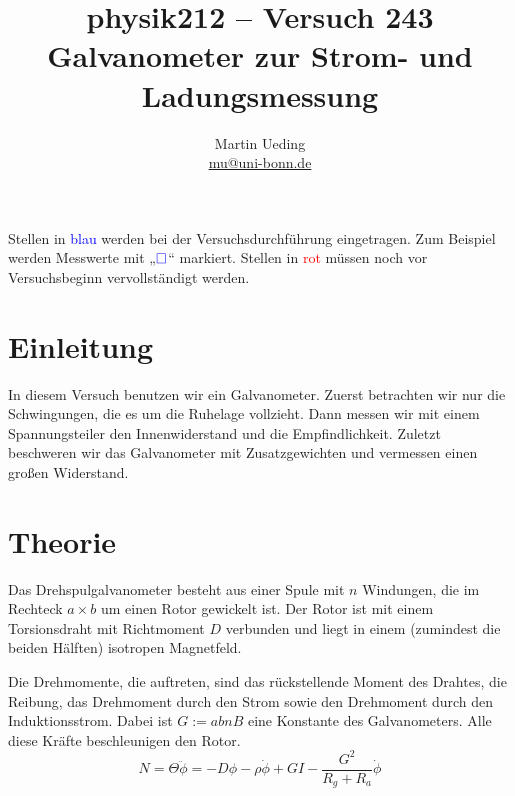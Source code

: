 \documentclass[11pt, ngerman]{article}
\title{physik212 -- Versuch 243 \\ Galvanometer zur Strom- und Ladungsmessung}
\author{Martin Ueding \\ {\small \href{mailto:mu@uni-bonn.de}{mu@uni-bonn.de}}}
\newcommand{\messwert}{\textcolor{blue}{\square}}
\begin{document}
\maketitle

\tableofcontents

\vfill

\begin{small}
	Stellen in \textcolor{blue}{blau} werden bei der Versuchsdurchführung
	eingetragen. Zum Beispiel werden Messwerte mit „$\messwert$“ markiert.
	Stellen in \textcolor{red}{rot} müssen noch vor Versuchsbeginn
	vervollständigt werden.
\end{small}

\newpage


\section{Einleitung}

In diesem Versuch benutzen wir ein Galvanometer. Zuerst betrachten wir nur die
Schwingungen, die es um die Ruhelage vollzieht. Dann messen wir mit einem
Spannungsteiler den Innenwiderstand und die Empfindlichkeit. Zuletzt beschweren
wir das Galvanometer mit Zusatzgewichten und vermessen einen großen Widerstand.


\section{Theorie}

Das Drehspulgalvanometer besteht aus einer Spule mit $n$ Windungen, die im
Rechteck $a \times b$ um einen Rotor gewickelt ist. Der Rotor ist mit einem
Torsionsdraht mit Richtmoment $D$ verbunden und liegt in einem (zumindest die
beiden Hälften) isotropen Magnetfeld.

Die Drehmomente, die auftreten, sind das rückstellende Moment des Drahtes, die
Reibung, das Drehmoment durch den Strom sowie den Drehmoment durch den
Induktionsstrom. Dabei ist $G := abnB$ eine Konstante des Galvanometers. Alle
diese Kräfte beschleunigen den Rotor.
\[
	N
	= \Theta \ddot \phi
	= - D \phi - \rho \dot \phi + G I - \frac{G^2}{R_g + R_a} \dot \phi
\]
\end{document}
